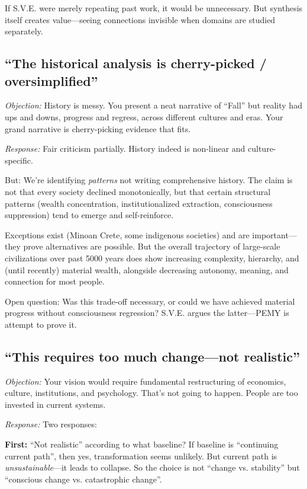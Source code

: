 \documentclass[11pt,a4paper]{article}
\theoremstyle{definition}
\theoremstyle{remark}
\begin{document}
If S.V.E. were merely repeating past work, it would be unnecessary. But synthesis itself creates value---seeing connections invisible when domains are studied separately.

\subsection{``The historical analysis is cherry-picked / oversimplified''}

\textit{Objection:} History is messy. You present a neat narrative of ``Fall'' but reality had ups and downs, progress and regress, across different cultures and eras. Your grand narrative is cherry-picking evidence that fits.

\textit{Response:} Fair criticism partially. History indeed is non-linear and culture-specific.

But: We're identifying \textit{patterns} not writing comprehensive history. The claim is not that every society declined monotonically, but that certain structural patterns (wealth concentration, institutionalized extraction, consciousness suppression) tend to emerge and self-reinforce.

Exceptions exist (Minoan Crete, some indigenous societies) and are important---they prove alternatives are possible. But the overall trajectory of large-scale civilizations over past 5000 years does show increasing complexity, hierarchy, and (until recently) material wealth, alongside decreasing autonomy, meaning, and connection for most people.

Open question: Was this trade-off necessary, or could we have achieved material progress without consciousness regression? S.V.E. argues the latter---PEMY is attempt to prove it.

\subsection{``This requires too much change---not realistic''}

\textit{Objection:} Your vision would require fundamental restructuring of economics, culture, institutions, and psychology. That's not going to happen. People are too invested in current systems.

\textit{Response:} Two responses:

\textbf{First:} ``Not realistic'' according to what baseline? If baseline is ``continuing current path'', then yes, transformation seems unlikely. But current path is \textit{unsustainable}---it leads to collapse. So the choice is not ``change vs. stability'' but ``conscious change vs. catastrophic change''.
\end{document}
